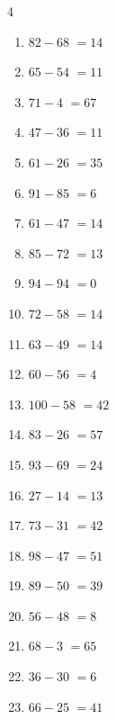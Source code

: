 \begin{multicols}{4}
\begin{enumerate}
  \item $82-68$
        $=14$

  \item $65-54$
        $=11$

  \item $71-4$
        $=67$

  \item $47-36$
        $=11$

  \item $61-26$
        $=35$

  \item $91-85$
        $=6$

  \item $61-47$
        $=14$

  \item $85-72$
        $=13$

  \item $94-94$
        $=0$

  \item $72-58$
        $=14$

  \item $63-49$
        $=14$

\columnbreak %

  \item $60-56$
        $=4$

  \item $100-58$
        $=42$

  \item $83-26$
        $=57$

  \item $93-69$
        $=24$

  \item $27-14$
        $=13$

  \item $73-31$
        $=42$

  \item $98-47$
        $=51$

  \item $89-50$
        $=39$

  \item $56-48$
        $=8$

  \item $68-3$
        $=65$

  \item $36-30$
        $=6$

  \item $66-25$
        $=41$


\end{enumerate}
\end{multicols}

